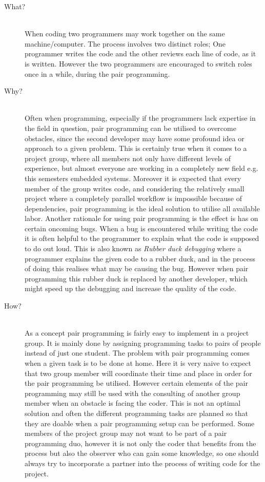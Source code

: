 \begin{description}
    \item[What?]\hfill\\
    When coding two programmers may work together on the same machine/computer.
The process involves two distinct roles; One programmer writes the code and the other reviews each line of code, as it is written. 
However the two programmers are encouraged to switch roles once in a while, during the pair programming.
    
    \item[Why?]\hfill\\ 
    Often when programming, especially if the programmers lack expertise in the field in question, pair programming can be utilised to overcome obstacles, since the second developer may have some profound idea or approach to a given problem.
    This is certainly true when it comes to a project group, where all members not only have different levels of experience, but almost everyone are working in a completely new field e.g. this semesters embedded systems.
    Moreover it is expected that every member of the group writes code, and considering the relatively small project where a completely parallel workflow is impossible because of dependencies, pair programming is the ideal solution to utilise all available labor.
    Another rationale for using pair programming is the effect is has on certain oncoming bugs.
    When a bug is encountered while writing the code it is often helpful to the programmer to explain what the code is supposed to do out loud.
    This is also known as \emph{Rubber duck debugging} where a programmer explains the given code to a rubber duck, and in the process of doing this realises what may be causing the bug.
    However when pair programming this rubber duck is replaced by another developer, which might speed up the debugging and increase the quality of the code.
    
    \item[How?]\hfill\\
    As a concept pair programming is fairly easy to implement in a project group.
    It is mainly done by assigning programming tasks to pairs of people instead of just one student.
    The problem with pair programming comes when a given task is to be done at home.
    Here it is very naive to expect that two group member will coordinate their time and place in order for the pair programming be utilised.
    However certain elements of the pair programming may still be used with the consulting of another group member when an obstacle is facing the coder.
    This is not an optimal solution and often the different programming tasks are planned so that they are doable when a pair programming setup can be performed.
    Some members of the project group may not want to be part of a pair programming duo, however it is not only the coder that benefits from the process but also the observer who can gain some knowledge, so one should always try to incorporate a partner into the process of writing code for the project. 
\end{description}
